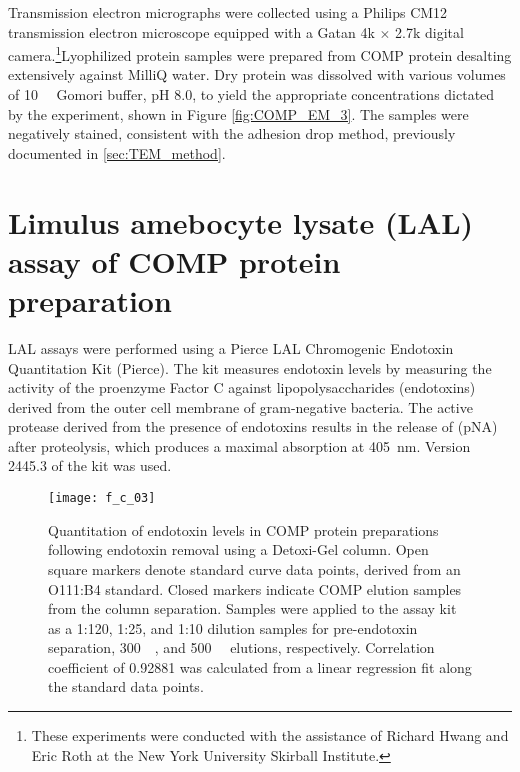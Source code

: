 Transmission electron micrographs were collected using a Philips CM12
transmission electron microscope equipped with a Gatan 4k ${\times}$ 2.7k
digital camera.\footnote{These experiments were conducted with the assistance of
Richard Hwang and Eric Roth at the New York University Skirball Institute.}Lyophilized protein samples were prepared from COMP protein
desalting extensively against MilliQ water. Dry protein was dissolved with
various volumes of \SI{10}{\milli\moLar} Gomori buffer, pH 8.0, to yield the
appropriate concentrations dictated by the experiment, shown in Figure
\ref{fig:COMP_EM_3}. The samples were negatively stained, consistent with
the adhesion drop method, previously documented in \ref{sec:TEM_method}. 

\section{Limulus amebocyte lysate (LAL) assay of COMP protein preparation}
\label{sec:lal_assay}
LAL assays were performed using a Pierce LAL Chromogenic Endotoxin Quantitation
Kit (Pierce). The kit measures endotoxin levels by measuring the activity of the
proenzyme Factor C against lipopolysaccharides (endotoxins) derived from the
outer cell membrane of gram-negative bacteria. The active protease derived from
the presence of endotoxins results in the release of 
(pNA) after proteolysis, which produces a maximal absorption at \SI{405}{\nm}.
Version 2445.3 of the kit was used.
\begin{figure}[h!] \centering \texttt{[image: f\_c\_03]}
    \caption{Quantitation of endotoxin levels in COMP protein preparations
        following endotoxin removal using a Detoxi-Gel column. Open square
        markers denote standard curve data points, derived from an
         O111:B4 standard. Closed markers indicate COMP elution
        samples from the column separation. Samples were applied to the assay
        kit as a 1:120, 1:25, and 1:10 dilution samples for pre-endotoxin
        separation, \SI{300}{\milli\moLar}, and \SI{500}{\milli\moLar} elutions,
    respectively. Correlation coefficient of 0.92881 was calculated from a
linear regression fit along the standard data points.}\label{fig:LAL_assay}
\end{figure}

